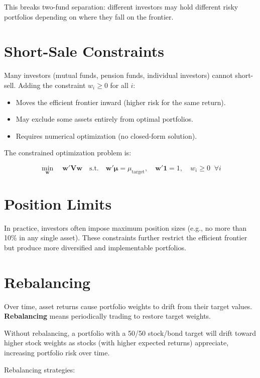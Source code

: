 \documentclass[11pt,letterpaper]{report}
\begin{document}
This breaks two-fund separation: different investors may hold different risky portfolios depending on where they fall on the frontier.

\section{Short-Sale Constraints}


Many investors (mutual funds, pension funds, individual investors) cannot short-sell.  Adding the constraint $w_i \geq 0$ for all $i$:

\begin{itemize}
  \item Moves the efficient frontier inward (higher risk for the same return).
  \item May exclude some assets entirely from optimal portfolios.
  \item Requires numerical optimization (no closed-form solution).
\end{itemize}

The constrained optimization problem is:

$$\min_{\mathbf{w}} \quad \mathbf{w}' \mathbf{V} \mathbf{w} \quad \text{s.t.} \quad \mathbf{w}' \boldsymbol{\mu} = \mu_{\text{target}}, \quad \mathbf{w}' \mathbf{1} = 1, \quad w_i \geq 0 \;\; \forall i$$

\section{Position Limits}


In practice, investors often impose maximum position sizes (e.g., no more than 10\% in any single asset).  These constraints further restrict the efficient frontier but produce more diversified and implementable portfolios.

\section{Rebalancing}


Over time, asset returns cause portfolio weights to drift from their target values.  \textbf{Rebalancing} means periodically trading to restore target weights.

Without rebalancing, a portfolio with a 50/50 stock/bond target will drift toward higher stock weights as stocks (with higher expected returns) appreciate, increasing portfolio risk over time.

Rebalancing strategies:
\end{document}
